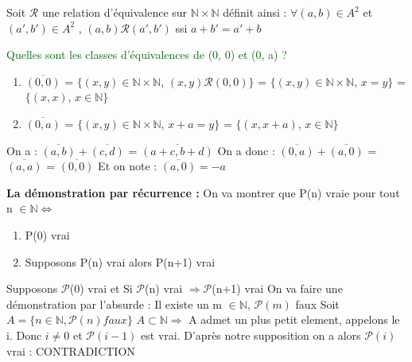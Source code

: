 \documentclass[12pt]{report}
\theoremstyle{break}%
\begin{document}
Soit $\mathcal{R}$ une relation d'\'equivalence sur $\mathbb{N} \times \mathbb{N}$  d\'efinit ainsi : \newline
$\forall (a,b) \in A^2$ et $(a',b') \in A^2$ , $(a,b)\mathcal{R}(a',b')$ ssi $ a+b'=a'+b $ \\

\begin{bf}
\textcolor{darkgreen}{Quelles sont les classes d'\'equivalences de (0, 0) et (0, a) ?}
\end{bf}

\begin{enumerate}
	\item $\overline{(0, 0)}$ = $\{(x,y) \in \mathbb{N} \times \mathbb{N}$, $(x,y)\mathcal{R}(0,0)\}$ = $\{(x,y) \in \mathbb{N} \times \mathbb{N}$, $x=y \}$ = $\{(x,x)$, $x \in \mathbb{N} \}$
	\item $\overline{(0, a)}$ = $\{(x,y) \in \mathbb{N} \times \mathbb{N}$, $x+a=y\}$ = $\{(x, x+a)$, $x \in \mathbb{N}\}$
\end{enumerate}

On a : $\overline{(a,b)} + \overline{(c, d)}$ = $\overline{(a+c, b+d)}$
\newline
On a donc : $\overline{(0, a)} + \overline{(a,0)}$ = $\overline{(a,a)}$ = $\overline{(0,0)}$
\newline
Et on note : $\overline{(a, 0)} = -a$ 
\newline

\textbf {La d\'emonstration par r\'ecurrence : }
\newline
On va montrer que P(n) vraie pour tout n $\in \mathbb{N} \Leftrightarrow $ 
\begin{enumerate}
	\item P(0) vrai
	\item Supposons P(n) vrai alors P(n+1) vrai
\end{enumerate}
Supposons $\mathcal{P}$(0) vrai et \newline
Si $\mathcal{P}$(n) vrai $\Rightarrow \mathcal{P}$(n+1) vrai \newline
On va faire une d\'emonstration par l'absurde : \newline
Il existe un m $\in \mathbb{N}$, $\mathcal{P}(m)$ faux \newline
Soit $A = \{n \in \mathbb{N}, \mathcal{P}(n) faux \}$ 
\newline
$A \subset \mathbb{N} \Rightarrow$ A admet un plus petit element, appelons le i.  
\newline
Donc $i \neq 0$ et $\mathcal{P}(i-1)$ est vrai. \newline
D'apr\`es notre supposition on a alors $\mathcal{P}(i)$ vrai : CONTRADICTION
\end{document}

